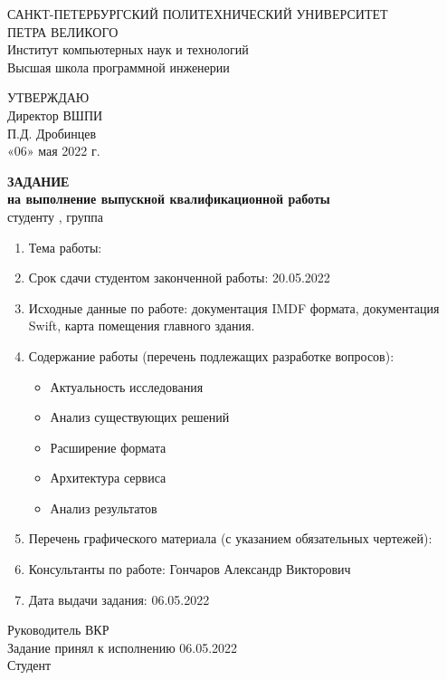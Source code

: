 \begin{center}
  {САНКТ-ПЕТЕРБУРГСКИЙ ПОЛИТЕХНИЧЕСКИЙ УНИВЕРСИТЕТ\\ ПЕТРА ВЕЛИКОГО} \\
  {Институт компьютерных наук и технологий} \\
  {Высшая школа программной инженерии} \\

  {
  \begin{flushright}
    УТВЕРЖДАЮ\\
    Директор ВШПИ\\
    \underline{\hspace{2.2cm}} П.Д. Дробинцев\\
    «06» мая 2022 г.\\[1.8cm]
  \end{flushright}
  }

  \textbf{ЗАДАНИЕ} \\
  \textbf{на выполнение выпускной квалификационной работы}\\
  студенту \AuthorFull, группа \Group \\[0.5cm]
  \begin{enumerate}[label=\arabic*.]
    \item Тема работы: \Theme
    \item Срок сдачи студентом законченной работы: 20.05.2022
    \item Исходные данные по работе: документация IMDF формата, документация Swift, карта помещения главного здания.
    \item Содержание работы (перечень подлежащих разработке вопросов):
      \begin{itemize}
        \item Актуальность исследования
        \item Анализ существующих решений
        \item Расширение формата
        \item Архитектура сервиса
        \item Анализ результатов
      \end{itemize}
    \item Перечень графического материала (с указанием обязательных чертежей):
    \item Консультанты по работе: Гончаров Александр Викторович
    \item Дата выдачи задания: 06.05.2022
  \end{enumerate}
\end{center}
Руководитель ВКР \hspace{3.5cm} \underline{\hspace{5cm}} \hfill \Supervisor\\[0.5cm]
Задание принял к исполнению 06.05.2022\\[0.5cm]
Студент \hspace{5.8cm} \underline{\hspace{5cm}} \hfill \Author\\
